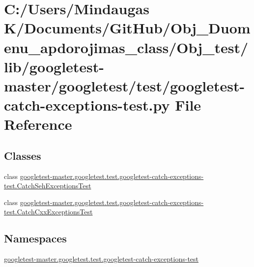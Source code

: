 \hypertarget{_obj__test_2lib_2googletest-master_2googletest_2test_2googletest-catch-exceptions-test_8py}{}\section{C\+:/\+Users/\+Mindaugas K/\+Documents/\+Git\+Hub/\+Obj\+\_\+\+Duomenu\+\_\+apdorojimas\+\_\+class/\+Obj\+\_\+test/lib/googletest-\/master/googletest/test/googletest-\/catch-\/exceptions-\/test.py File Reference}
\label{_obj__test_2lib_2googletest-master_2googletest_2test_2googletest-catch-exceptions-test_8py}
\subsection*{Classes}
\begin{DoxyCompactItemize}
\item 
class \mbox{\hyperlink{classgoogletest-master_1_1googletest_1_1test_1_1googletest-catch-exceptions-test_1_1_catch_seh_exceptions_test}{googletest-\/master.\+googletest.\+test.\+googletest-\/catch-\/exceptions-\/test.\+Catch\+Seh\+Exceptions\+Test}}
\item 
class \mbox{\hyperlink{classgoogletest-master_1_1googletest_1_1test_1_1googletest-catch-exceptions-test_1_1_catch_cxx_exceptions_test}{googletest-\/master.\+googletest.\+test.\+googletest-\/catch-\/exceptions-\/test.\+Catch\+Cxx\+Exceptions\+Test}}
\end{DoxyCompactItemize}
\subsection*{Namespaces}
\begin{DoxyCompactItemize}
\item 
 \mbox{\hyperlink{namespacegoogletest-master_1_1googletest_1_1test_1_1googletest-catch-exceptions-test}{googletest-\/master.\+googletest.\+test.\+googletest-\/catch-\/exceptions-\/test}}
\end{DoxyCompactItemize}
